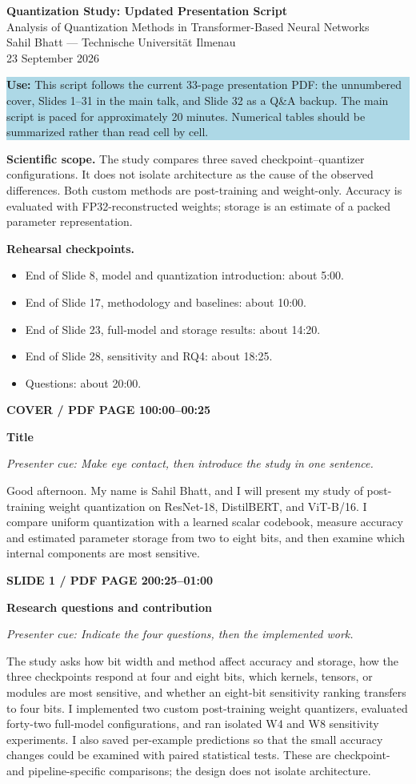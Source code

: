\documentclass[11pt,a4paper]{article}
\newcommand{\slidetitle}[3]{%
  \vspace{2mm}\noindent
  \colorbox{TUblue}{\parbox{\dimexpr\textwidth-2\fboxsep}{\color{white}\bfseries #1\hfill #2}}%
  \par\textcolor{TUorange}{\bfseries #3}\par
}
\newcommand{\cue}[1]{\textit{\textcolor{TUblue}{Presenter cue: #1}}\par}
\newcommand{\spoken}[1]{#1\par}
\begin{document}
\begin{center}
{\Large\bfseries\textcolor{TUorange}{Quantization Study: Updated Presentation Script}}\\[3mm]
{\large Analysis of Quantization Methods in Transformer-Based Neural Networks}\\[4mm]
Sahil Bhatt --- Technische Universit\"at Ilmenau\\
23 September 2026
\end{center}

\colorbox{lightblue}{\parbox{\dimexpr\textwidth-2\fboxsep}{
\textbf{Use:} This script follows the current 33-page presentation PDF: the unnumbered cover, Slides 1--31 in the main talk, and Slide 32 as a Q\&A backup. The main script is paced for approximately 20 minutes. Numerical tables should be summarized rather than read cell by cell.
}}

\textbf{Scientific scope.} The study compares three saved checkpoint--quantizer configurations. It does not isolate architecture as the cause of the observed differences. Both custom methods are post-training and weight-only. Accuracy is evaluated with FP32-reconstructed weights; storage is an estimate of a packed parameter representation.

\textbf{Rehearsal checkpoints.}
\begin{itemize}
  \item End of Slide 8, model and quantization introduction: about 5:00.
  \item End of Slide 17, methodology and baselines: about 10:00.
  \item End of Slide 23, full-model and storage results: about 14:20.
  \item End of Slide 28, sensitivity and RQ4: about 18:25.
  \item Questions: about 20:00.
\end{itemize}

\slidetitle{COVER / PDF PAGE 1}{00:00--00:25}{Title}
\cue{Make eye contact, then introduce the study in one sentence.}
\spoken{Good afternoon. My name is Sahil Bhatt, and I will present my study of post-training weight quantization on ResNet-18, DistilBERT, and ViT-B/16. I compare uniform quantization with a learned scalar codebook, measure accuracy and estimated parameter storage from two to eight bits, and then examine which internal components are most sensitive.}

\slidetitle{SLIDE 1 / PDF PAGE 2}{00:25--01:00}{Research questions and contribution}
\cue{Indicate the four questions, then the implemented work.}
\spoken{The study asks how bit width and method affect accuracy and storage, how the three checkpoints respond at four and eight bits, which kernels, tensors, or modules are most sensitive, and whether an eight-bit sensitivity ranking transfers to four bits. I implemented two custom post-training weight quantizers, evaluated forty-two full-model configurations, and ran isolated W4 and W8 sensitivity experiments. I also saved per-example predictions so that the small accuracy changes could be examined with paired statistical tests. These are checkpoint- and pipeline-specific comparisons; the design does not isolate architecture.}
\end{document}
